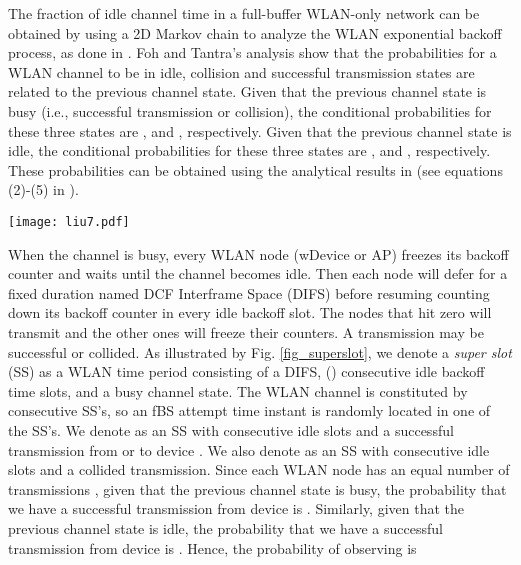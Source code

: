 \documentclass[journal,final,letterpaper,10pt,doublecolumn,twoside]{IEEEtran}
\begin{document}
The fraction of idle channel time in a full-buffer WLAN-only network
can be obtained by using a 2D Markov chain to analyze the WLAN
exponential backoff process, as done in
\cite{Bianchi,WiFi_modeling_Foh_freezingCounter,WiFi_analysis_freezingCounter_Lee2005Conf}.
Foh and Tantra's analysis \cite{WiFi_modeling_Foh_freezingCounter}
show that the probabilities for a WLAN channel to be in idle,
collision and successful transmission states are related to the
previous channel state. Given that the previous channel state is
busy (i.e., successful transmission or collision), the conditional
probabilities for these three states are ,  and ,
respectively. Given that the previous channel state is  idle, the
conditional probabilities for these three states are , 
and , respectively. These probabilities can be obtained using
the analytical results in \cite{WiFi_modeling_Foh_freezingCounter}
(see equations (2)-(5) in \cite{WiFi_modeling_Foh_freezingCounter}).






\begin{figure*}
  \center
  \texttt{[image: liu7.pdf]}
  \caption{WLAN channel can be viewed as consisting of consecutive super slots.} \label{fig_superslot}
\end{figure*}



When the channel is busy, every WLAN node (wDevice or AP) freezes
its backoff counter and waits until the channel becomes idle. Then
each node will defer for a fixed duration named DCF Interframe
Space (DIFS) before resuming counting down its backoff counter in
every idle backoff slot.  The nodes that hit zero will transmit and
the other ones will freeze their counters. A transmission may be
successful or collided. As illustrated by Fig. \ref{fig_superslot},
we denote a \emph{super slot} (SS) as a WLAN time period consisting
of a DIFS,   () consecutive idle backoff time
slots, and a busy channel state. The WLAN channel is constituted by
consecutive SS's, so an fBS attempt time instant is randomly located
in one of the SS's. We denote  as an SS with 
consecutive idle slots and a successful transmission from or to device
. We also denote  as an SS with  consecutive idle
slots and a collided transmission. Since each WLAN node has an equal
number of transmissions \cite{equal_access_measure_infocom2003},
given that the previous channel state is busy, the probability that
we have a successful transmission from device  is .
Similarly, given that the previous channel state is idle, the
probability that we have a successful transmission from device  is
. Hence, the probability of observing  is
\end{document}
